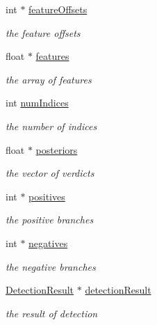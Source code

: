 \begin{DoxyCompactItemize}
int $\ast$ \hyperlink{classtld_1_1EnsembleClassifier_acf42e105ca1cb616aaf2d8e4d8755c41}{feature\-Offsets}
\begin{DoxyCompactList}\small\item\em the feature offsets \end{DoxyCompactList}\item 
float $\ast$ \hyperlink{classtld_1_1EnsembleClassifier_a02deffee640b4106051024d1ae8a55aa}{features}
\begin{DoxyCompactList}\small\item\em the array of features \end{DoxyCompactList}\item 
int \hyperlink{classtld_1_1EnsembleClassifier_afbfbda1b693525895467fba88a8debe3}{num\-Indices}
\begin{DoxyCompactList}\small\item\em the number of indices \end{DoxyCompactList}\item 
float $\ast$ \hyperlink{classtld_1_1EnsembleClassifier_a34092918268be97eb1e1f2f0fc7d4254}{posteriors}
\begin{DoxyCompactList}\small\item\em the vector of verdicts \end{DoxyCompactList}\item 
int $\ast$ \hyperlink{classtld_1_1EnsembleClassifier_a572549e31f9bfc34c7b464e02aa41397}{positives}
\begin{DoxyCompactList}\small\item\em the positive branches \end{DoxyCompactList}\item 
int $\ast$ \hyperlink{classtld_1_1EnsembleClassifier_a2de7561eb20a0f0a1b4909d6dfd89d0b}{negatives}
\begin{DoxyCompactList}\small\item\em the negative branches \end{DoxyCompactList}\item 
\hyperlink{classtld_1_1DetectionResult}{Detection\-Result} $\ast$ \hyperlink{classtld_1_1EnsembleClassifier_af57e5de2c583e7f1cf39e6de03159323}{detection\-Result}
\begin{DoxyCompactList}\small\item\em the result of detection \end{DoxyCompactList}\end{DoxyCompactItemize}
